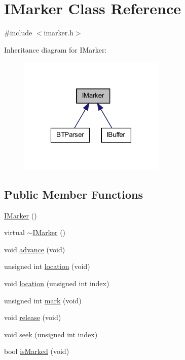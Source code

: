 \hypertarget{class_i_marker}{
\section{IMarker Class Reference}
\label{class_i_marker}
}


{\ttfamily \#include $<$imarker.h$>$}



Inheritance diagram for IMarker:\nopagebreak
\begin{figure}[H]
\begin{center}
\leavevmode
\includegraphics[width=198pt]{class_i_marker__inherit__graph}
\end{center}
\end{figure}
\subsection*{Public Member Functions}
\begin{DoxyCompactItemize}
\item 
\hyperlink{class_i_marker_afbe7a5bbe8cb8f1b86e7ebf7d62782d4}{IMarker} ()
\item 
virtual \hyperlink{class_i_marker_afefb80c6283b5f2327faa16ab131c875}{$\sim$IMarker} ()
\item 
void \hyperlink{class_i_marker_a68c539e79c3052ba7addf090dfd05985}{advance} (void)
\item 
unsigned int \hyperlink{class_i_marker_a0e9628e8c66b493ff331abab55c744da}{location} (void)
\item 
void \hyperlink{class_i_marker_ac2d7a0e8bbfb213378f7a19b50ec9686}{location} (unsigned int index)
\item 
unsigned int \hyperlink{class_i_marker_a92024922612faa5bb0106609f151c050}{mark} (void)
\item 
void \hyperlink{class_i_marker_afce4bb0bef01b4579db97e1ca5e64001}{release} (void)
\item 
void \hyperlink{class_i_marker_a58086bbf091c5b49c15464a070fec171}{seek} (unsigned int index)
\item 
bool \hyperlink{class_i_marker_ae6fda228fa071a9720e7d2309d47ac6e}{isMarked} (void)
\end{DoxyCompactItemize}
